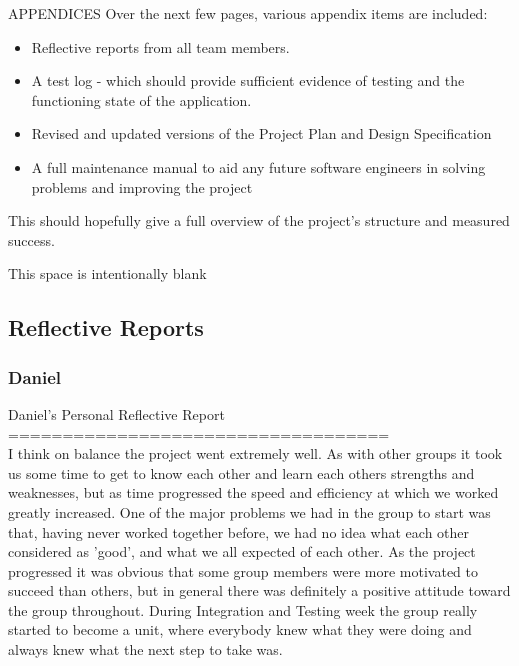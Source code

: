 \documentclass{article}
\begin{document}
	\begin{section}{APPENDICES}
		Over the next few pages, various appendix items are included:
		
		\begin{itemize}
			\item{Reflective reports from all team members.}
			\item{A test log - which should provide sufficient evidence of testing and the functioning state of the application.}
			\item{Revised and updated versions of the Project Plan and Design Specification}
			\item{A full maintenance manual to aid any future software engineers in solving problems and improving the project}
		\end{itemize}

		This should hopefully give a full overview of the project's structure and measured success.
		
		\vspace{3in}
		\begin{center}
			This space is intentionally blank
		\end{center}
		
		\clearpage
		\subsection{Reflective Reports}
			\subsubsection{Daniel}
				\begin{tt}
				Daniel's Personal Reflective Report \\
				=================================== \\

				I think on balance the project went extremely well. As with other groups it took us some time to get to know each other and learn each others strengths and weaknesses, but as time progressed the speed and efficiency at which we worked greatly increased. One of the major problems we had in the group to start was that, having never worked together before, we had no idea what each other considered as 'good', and what we all expected of each other. As the project progressed it was obvious that some group members were more motivated to succeed than others, but in general there was definitely a positive attitude toward the group throughout. During Integration and Testing week the group really started to become a unit, where everybody knew what they were doing and always knew what the next step to take was. \\


\end{tt}
\end{section}
\end{document}
